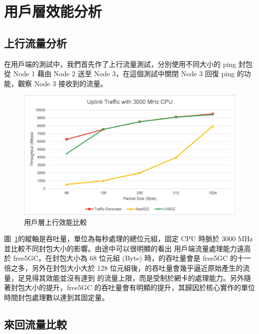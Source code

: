 \section{用戶層效能分析}
\label{sec:up_evaluation}

\subsection{上行流量分析}
\label{subsec:uplink_evaluation}

在用戶端的測試中，我們首先作了上行流量測試，分別使用不同大小的 ping 封包從 Node 1 藉由 Node 2 送至 Node 3，在這個測試中關閉 Node 3 回復 ping 的功能，觀察 Node 3 接收到的流量。

\begin{figure}[htb]
    \centering
    \includegraphics[height=!,width=0.8\linewidth,keepaspectratio=true]{figures/up_eva_pkt_size}
    \caption[用戶層上行效能比較]{{\footnotesize 用戶層上行效能比較}}
    \label{fig:up_eva_pkt_size}
\end{figure}

圖~\ref{fig:up_eva_pkt_size}的縱軸是吞吐量，單位為每秒處理的總位元組，固定 CPU 時脈於 3000 MHz 並比較不同封包大小的影響。由途中可以很明顯的看出 \LHCN 用戶端流量處理能力遠高於 free5GC。在封包大小為 68 位元組 (Byte) 時，\LHCN 的吞吐量會是 free5GC 的十一倍之多，另外在封包大小大於 128 位元組後，\LHCN 的吞吐量會幾乎逼近原始產生的流量，足見得其效能並沒有達到 \LHCN 的流量上限，而是受制於網卡的處理能力。另外隨著封包大小的提升，free5GC 的吞吐量會有明顯的提升，其歸因於核心實作的單位時間封包處理數以達到其固定量。

\subsection{來回流量比較}
\label{subsec:uldl_comp}


